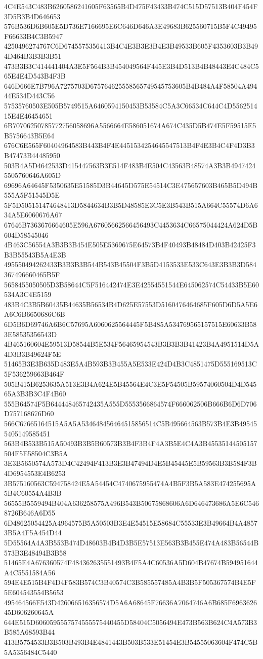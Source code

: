 {{{{{{{{{{{{{{{{{{{{{4C4E543C483B6260586241605F63565B4D475F43433B474C515D57513B404F454F3D5B3B4D646653
576B536D6B605E5D736E7166695E6C646D646A3E49683B625560715B5F4C49495F66633B4C3B5947
4250496274767C6D6745575356413B4C4E3B3E3B4E3B49533B605F4353603B3B494D464B3B3B3B51
473B3B3C414441404A3E5F564B3B454049564F445E3B4D513B4B48443E4C484C565E4E4D543B4F3B
646D666E7B796A7275703D675764625558565749545753605B4B484A4F58504A49444E534D443C56
57535760503E505B5749515A6460594150453B53584C5A3C66534C644C4D556251415E4E46454651
6B70706250785772756058696A5566664E586051674A674C435D5B474E5F59515E5B5756643B5E64
676C6E565F60404964583B443B4F4E4451534254645547513B4F4E3B4C4F4D3B3B47473B44485950
503B4A5D4642533D415447563B3E514F483B4E504C43563B48574A3B3B49474245505760646A605D
69696A64645F5350635E51585D3B44645D575E54514C3E475657603B465B5D494B555A5F51545D5E
5F5D505151474648413D5844634B3B5D48585E3C5E3B543B515A664C55574D6A634A5E6060676A67
67646B7363676664605E596A67605662566456493C4453634C66575044424A624D5B604D58545046
4B463C56554A3B3B3B454E505E5369675E64573B4F40493B48484D403B42425F3B3B55543B5A4E3B
495550494262433B3B3B3B544B543B45504F3B5D4153533E533C643E3B3B3D584367496660465B5F
5658455050505D3B58644C5F516442474E3E42554551544E645062574C54433B5E60534A3C4E5159
483B4C3B5B60435B44635B56534B4D625E57553D5160476464685F605D6D5A5E6A6C6B6650686C6B
6D5B6D69746A6B6C57695A6060625564445F5B485A534769565157515E60633B583E58535356543D
4B465160604E59513D58544B5E534F56465954543B3B3B3B41423B4A4951514D5A4D3B3B49624F5E
51465B3E3B635D483E5A4B593B3B455A5E533E424D4B3C4851475D555169513C5F536259663B464F
505B415B6253635A513E3B4A624E5B45564E4C3E5F54505B59574060504D4D54565A3B3B3C4F4B60
555B64574F5B644448465742435A555D5553566864574F666062506B666B6D6D706D757168676D60
566C67665164515A5A5A534648456464515856514C5B495664563B573B4E3B495455405149585451
563B4B533B515A50493B3B5B60573B3B4F3B4F4A3B5E4C4A3B45535144505157504F5E58504C3B5A
3E3B5650574A573D4C42494F413B3E3B47494D4E5B45445E5B59563B3B584F3B4D6954553E4B6253
3B575160563C594758424E5A54454C4740675955474A4B5F3B5A583E474255695A5B4C60554A4B3B
56555B5559494B404A636258575A496B543B50675868606A6D646473686A5E6C5468726B646A6D55
6D48625054425A4964575B5A50503B3E4E54515E58684C55533E3B49664B4A48573B5A4F5A454D44
5D55564A4A3B553B474D48603B4B4D3B5E57513E563B3B455E474A483B56544B573B3E48494B3B58
51465E4A676360574F484362635551493B4F5A4C60536A5D604B47674B594951644A4C5551584A56
594E4E515B4F4D4F583B574C3B40574C3B585557485A4B3B5F505367574B4E5F5E604543554B5653
495464566E543D426066516356574D5A6A68645F76636A7064746A6B685F696362645D606260645A
644E515D6060595557574555575440455D58404C5056494E473B563B624C4A573B3B585A68593B44
413B5754533B3B503B493B4E4841443B503B533E51454E3B54555063604F474C5B5A5356484C5440
}}}}}}}}}}}}}}}}}}}}}
